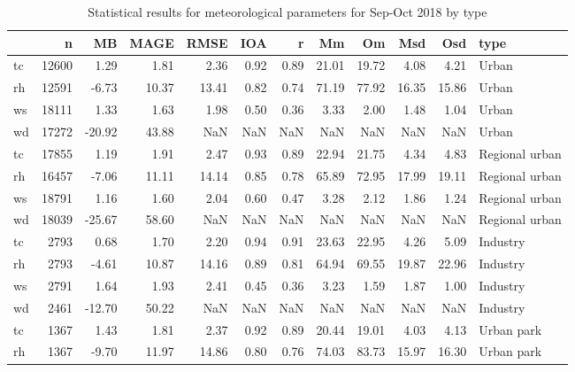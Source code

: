 \begin{table}
\centering
\caption{Statistical results for meteorological parameters for Sep-Oct 2018 by type}
\label{tab:stats_all_type}
\begin{tabular}{lrrrrrrrrrrl}
\toprule
{} &      n &     MB &   MAGE &   RMSE &   IOA &     r &     Mm &     Om &    Msd &    Osd &                 type \\
\midrule
tc &  12600 &   1.29 &   1.81 &   2.36 &  0.92 &  0.89 &  21.01 &  19.72 &   4.08 &   4.21 &                Urban \\
rh &  12591 &  -6.73 &  10.37 &  13.41 &  0.82 &  0.74 &  71.19 &  77.92 &  16.35 &  15.86 &                Urban \\
ws &  18111 &   1.33 &   1.63 &   1.98 &  0.50 &  0.36 &   3.33 &   2.00 &   1.48 &   1.04 &                Urban \\
wd &  17272 & -20.92 &  43.88 &    NaN &   NaN &   NaN &    NaN &    NaN &    NaN &    NaN &                Urban \\
tc &  17855 &   1.19 &   1.91 &   2.47 &  0.93 &  0.89 &  22.94 &  21.75 &   4.34 &   4.83 &       Regional urban \\
rh &  16457 &  -7.06 &  11.11 &  14.14 &  0.85 &  0.78 &  65.89 &  72.95 &  17.99 &  19.11 &       Regional urban \\
ws &  18791 &   1.16 &   1.60 &   2.04 &  0.60 &  0.47 &   3.28 &   2.12 &   1.86 &   1.24 &       Regional urban \\
wd &  18039 & -25.67 &  58.60 &    NaN &   NaN &   NaN &    NaN &    NaN &    NaN &    NaN &       Regional urban \\
tc &   2793 &   0.68 &   1.70 &   2.20 &  0.94 &  0.91 &  23.63 &  22.95 &   4.26 &   5.09 &             Industry \\
rh &   2793 &  -4.61 &  10.87 &  14.16 &  0.89 &  0.81 &  64.94 &  69.55 &  19.87 &  22.96 &             Industry \\
ws &   2791 &   1.64 &   1.93 &   2.41 &  0.45 &  0.36 &   3.23 &   1.59 &   1.87 &   1.00 &             Industry \\
wd &   2461 & -12.70 &  50.22 &    NaN &   NaN &   NaN &    NaN &    NaN &    NaN &    NaN &             Industry \\
tc &   1367 &   1.43 &   1.81 &   2.37 &  0.92 &  0.89 &  20.44 &  19.01 &   4.03 &   4.13 &           Urban park \\
rh &   1367 &  -9.70 &  11.97 &  14.86 &  0.80 &  0.76 &  74.03 &  83.73 &  15.97 &  16.30 &           Urban park \\

\end{tabular}
\end{table}
